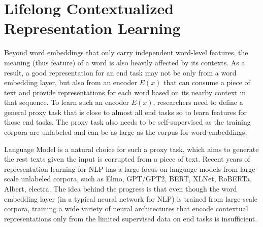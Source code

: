 

\chapter{Lifelong Contextualized Representation Learning}
\label{chap4:context}

Beyond word embeddings that only carry independent word-level features, the meaning (thus feature) of a word is also heavily affected by its contexts.
As a result, a good representation for an end task may not be only from a word embedding layer, but also from an encoder $E(x)$ that can consume a piece of text and provide representations for each word based on its nearby context in that sequence.
To learn such an encoder $E(x)$, researchers need to define a general proxy task that is close to almost all end tasks so to learn features for those end tasks.
The proxy task also needs to be self-supervised as the training corpora are unlabeled and can be as large as the corpus for word embeddings.

Language Model is a natural choice for such a proxy task, which aims to generate the rest texts given the input is corrupted from a piece of text.
Recent years of representation learning for NLP has a large focus on language models from large-scale unlabeled corpora, such as Elmo\cite{peters2018deep}, GPT/GPT2\cite{radford2018improving}, BERT\cite{devlin2018bert}, XLNet\cite{yang}, RoBERTa\cite{liu2019roberta}, Albert\cite{lan}, electra\cite{stanford}.
The idea behind the progress is that even though the word embedding \cite{mikolov2013distributed,pennington2014glove} layer (in a typical neural network for NLP) is trained from large-scale corpora, training a wide variety of neural architectures that encode contextual representations only from the limited supervised data on end tasks is insufficient.

